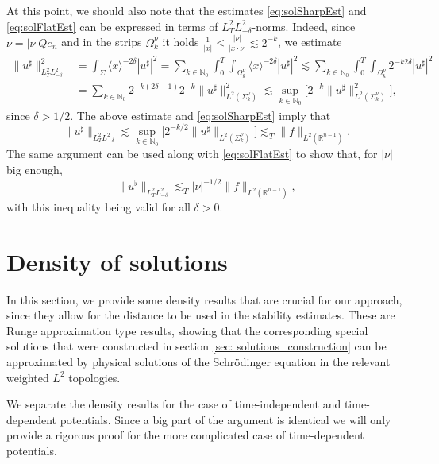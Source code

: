 \documentclass[10pt,a4paper]{amsart}
\theoremstyle{remark}
\theoremstyle{definition}
\newcommand{\R}{\mathbb{R}}
\newcommand{\N}{\mathbb{N}}
\def\lec{\lesssim}
\begin{document}
At this point, we should also note that the estimates \eqref{eq:solSharpEst} and \eqref{eq:solFlatEst} can be expressed in terms of $L^2_TL^2_{-\delta}$-norms. Indeed, since $\nu=|\nu| Qe_n$ and in the strips $\Omega^\nu_k$ it holds $ \frac{1}{|x|} \leq \frac{|\nu|}{|x\cdot\nu|} \lec 2^{-k} $, we estimate
%
\[
\begin{aligned}
\|u^\sharp\|^2_{L^2_TL^2_{-\delta}} &= \int_{\Sigma} \langle x\rangle ^{-2\delta}|u^\sharp|^2
=\sum_{k\in\N_0} \int_{0}^T\int_{\Omega^\nu_k} \langle x\rangle ^{-2\delta}|u^\sharp|^2 
\lec \sum_{ k \in\N_0} \int_{0}^T \int_{\Omega^\nu_k} 2^{-k2\delta} |u^\sharp|^2 \\
&= \sum_{ k \in\N_0} 2^{-k (2\delta-1)} 2^{-k} \| u^\sharp \|_{L^2(\Sigma^\nu_k)}^2
\lec \sup_{k\in\N_0}\big[ 2^{-k}\| u^\sharp \|_{L^2(\Sigma^\nu_k)}^2 \big],
\end{aligned}
\]
%
since $\delta>1/2$. The above estimate and \eqref{eq:solSharpEst} imply that 
%
\begin{equation}\label{eq:solSharpEst2}
	\|u^\sharp\|_{L^2_TL^2_{-\delta}}\lec \sup_{k\in\N_0}\big[ 2^{-k/2}\| u^\sharp \|_{L^2(\Sigma^\nu_k)} \big] 
	 \lec_T  \| f \|_{L^2(\R^{n - 1})}.
\end{equation}
%
The same argument can be used along with \eqref{eq:solFlatEst} to show that, for $|\nu|$ big enough, 
%
\begin{equation}\label{eq:solFlatEst2}
	\|u^\flat\|_{L^2_TL^2_{-\delta}} \lec_T |\nu|^{-1/2} \| f \|_{L^2(\R^{n - 1})},
\end{equation}
%
with this inequality being valid for all $\delta>0$.
%








\section{Density of solutions}\label{sec: density}
In this section, we provide some density results that are crucial for our approach, since they allow for the distance to be used in the stability estimates. These are Runge approximation type results, showing that the corresponding special solutions that were
constructed in section \ref{sec: solutions_construction} can be approximated by physical solutions of the Schr\"odinger equation in the relevant weighted $L^2$ topologies.

We separate the density results for the case of time-independent and time-dependent potentials. Since a big part of the argument is identical we will only provide a rigorous proof for the more complicated case of time-dependent potentials. 
\end{document}
